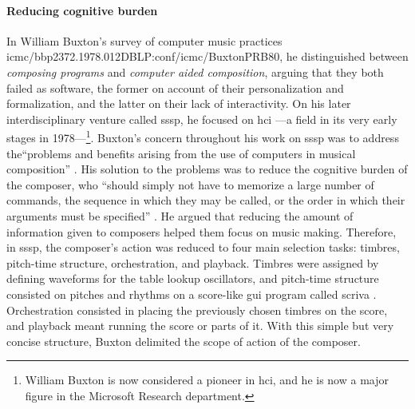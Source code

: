 	\paragraph{Reducing cognitive burden}
	In William Buxton's survey of computer music practices \parencite{Bux77:Aco}{icmc/bbp2372.1978.012}{DBLP:conf/icmc/BuxtonPRB80}, he distinguished between \textit{composing programs} and \textit{computer aided composition}, arguing that they both failed as software, the former on account of their personalization and formalization, and the latter on their lack of interactivity. On his later interdisciplinary venture called \gls{sssp}, he focused on \gls{hci} ---a field in its very early stages in 1978---\footnote{William Buxton is now considered a pioneer in \gls{hci}, and he is now a major figure in the Microsoft Research department.}. Buxton's concern throughout his work on \gls{sssp} was to address the``problems and benefits arising from the use of computers in musical composition'' \parencite[472]{DBLP:conf/icmc/BuxtonFBRSCM78}. His solution to the problems was to reduce the cognitive burden of the composer, who ``should simply not have to memorize a large number of commands, the sequence in which they may be called, or the order in which their arguments must be specified'' \parencite[474]{DBLP:conf/icmc/BuxtonFBRSCM78}. He argued that reducing the amount of information given to composers helped them focus on music making. Therefore, in \gls{sssp}, the composer's action was reduced to four main selection tasks: timbres, pitch-time structure, orchestration, and playback. Timbres were assigned by defining waveforms for the table lookup oscillators, and pitch-time structure consisted on pitches and rhythms on a score-like \gls{gui} program called \gls{scriva} \parencite{youtube/buxton10}. Orchestration consisted in placing the previously chosen timbres on the score, and playback meant running the score or parts of it. With this simple but very concise structure, Buxton delimited the scope of action of the composer.

